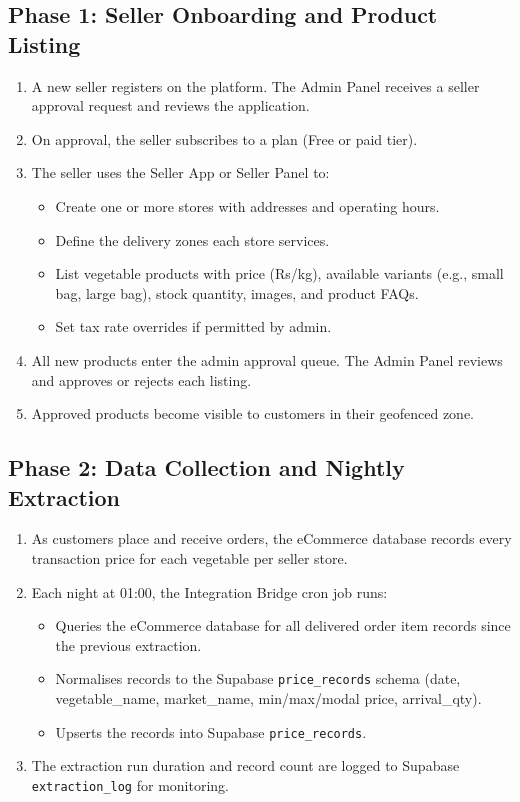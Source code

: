 \documentclass[12pt, a4paper, oneside]{report}
\begin{document}
\subsection{Phase 1: Seller Onboarding and Product Listing}

\begin{enumerate}
  \item A new seller registers on the platform. The Admin Panel receives a
        seller approval request and reviews the application.
  \item On approval, the seller subscribes to a plan (Free or paid tier).
  \item The seller uses the Seller App or Seller Panel to:
    \begin{itemize}
      \item Create one or more stores with addresses and operating hours.
      \item Define the delivery zones each store services.
      \item List vegetable products with price (Rs/kg), available variants
            (e.g., small bag, large bag), stock quantity, images, and
            product FAQs.
      \item Set tax rate overrides if permitted by admin.
    \end{itemize}
  \item All new products enter the admin approval queue. The Admin Panel
        reviews and approves or rejects each listing.
  \item Approved products become visible to customers in their geofenced zone.
\end{enumerate}

\subsection{Phase 2: Data Collection and Nightly Extraction}

\begin{enumerate}
  \item As customers place and receive orders, the eCommerce database records
        every transaction price for each vegetable per seller store.
  \item Each night at 01:00, the Integration Bridge cron job runs:
    \begin{itemize}
      \item Queries the eCommerce database for all delivered order item records
            since the previous extraction.
      \item Normalises records to the Supabase \texttt{price\_records} schema
            (date, vegetable\_name, market\_name, min/max/modal price,
            arrival\_qty).
      \item Upserts the records into Supabase \texttt{price\_records}.
    \end{itemize}
  \item The extraction run duration and record count are logged to Supabase
        \texttt{extraction\_log} for monitoring.
\end{enumerate}
\end{document}
